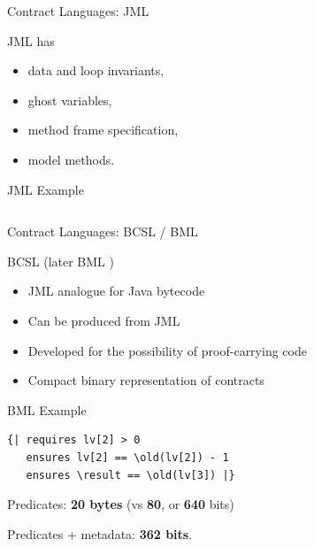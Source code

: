 \documentclass[12pt]{beamer}
\begin{document}
\begin{frame}[fragile]{Contract Languages: \small JML}

  JML \parencite{jml} has

  \begin{itemize}
    \item data and loop invariants,
    \item ghost variables,
    \item method frame specification,
    \item model methods.
  \end{itemize}
\end{frame}

\begin{frame}{JML Example}
  \inputminted[fontsize=\footnotesize]{java}{jmlstack.java}
\end{frame}

\begin{frame}{Contract Languages: \small BCSL / BML}

  BCSL \parencite{bcsl} (later BML \parencite{bml})

  \begin{itemize}
    \item JML analogue for Java bytecode
    \item Can be produced from JML
    \item Developed for the possibility of proof-carrying code
    \item Compact binary representation of contracts
  \end{itemize}
\end{frame}

\begin{frame}[fragile]{BML Example}
  \begin{verbatim}
{| requires lv[2] > 0
   ensures lv[2] == \old(lv[2]) - 1
   ensures \result == \old(lv[3]) |}
  \end{verbatim}

  \vspace{0.25cm}

  Predicates: \textbf{20 bytes} (vs \textbf{80}, or \textbf{640} bits)

  \vspace{0.25cm}

  Predicates + metadata: \textbf{362 bits}.
\end{frame}
\end{document}
